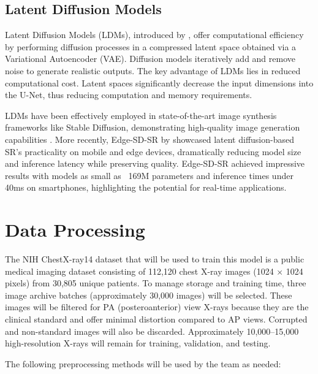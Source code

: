 \documentclass{article} %
\begin{document}
\subsection{Latent Diffusion Models}

Latent Diffusion Models (LDMs), introduced by \citet{rombach2022latent}, offer computational efficiency by performing diffusion processes in a compressed latent space obtained via a Variational Autoencoder (VAE). Diffusion models iteratively add and remove noise to generate realistic outputs. The key advantage of LDMs lies in reduced computational cost. Latent spaces significantly decrease the input dimensions into the U-Net, thus reducing computation and memory requirements.

LDMs have been effectively employed in state-of-the-art image synthesis frameworks like Stable Diffusion, demonstrating high-quality image generation capabilities \citep{rombach2022latent}. More recently, Edge-SD-SR by \citet{mehdi2025edgesd} showcased latent diffusion-based SR's practicality on mobile and edge devices, dramatically reducing model size and inference latency while preserving quality. Edge-SD-SR achieved impressive results with models as small as ~169M parameters and inference times under 40ms on smartphones, highlighting the potential for real-time applications.

\section{Data Processing}

The NIH ChestX-ray14 dataset that will be used to train this model is a public medical imaging dataset consisting of 112,120 chest X-ray images (1024 × 1024 pixels) from 30,805 unique patients. To manage storage and training time, three image archive batches (approximately 30,000 images) will be selected. These images will be filtered for PA (posteroanterior) view X-rays because they are the clinical standard and offer minimal distortion compared to AP views. Corrupted and non-standard images will also be discarded. Approximately 10,000–15,000 high-resolution X-rays will remain for training, validation, and testing.

The following preprocessing methods will be used by the team as needed:
\end{document}
